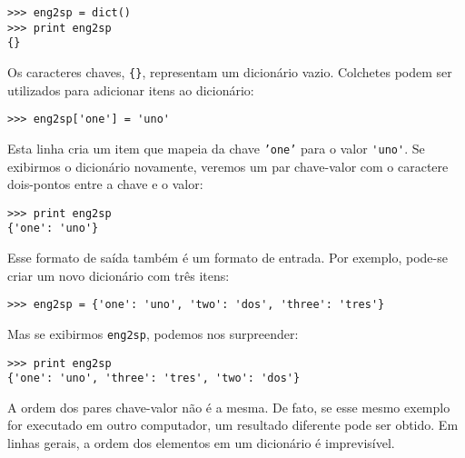 \beforeverb
\begin{verbatim}
>>> eng2sp = dict()
>>> print eng2sp
{}
\end{verbatim}
\afterverb
%

Os caracteres chaves, \verb"{}", representam um dicionário vazio.
Colchetes podem ser utilizados para adicionar itens ao dicionário:


\beforeverb
\begin{verbatim}
>>> eng2sp['one'] = 'uno'
\end{verbatim}
\afterverb
%

Esta linha cria um item que mapeia da chave {\tt 'one'}
para o valor \verb"'uno'". Se exibirmos o dicionário novamente, veremos
um par chave-valor com o caractere dois-pontos entre a chave e o valor:

\beforeverb
\begin{verbatim}
>>> print eng2sp
{'one': 'uno'}
\end{verbatim}
\afterverb
%

Esse formato de saída também é um formato de entrada. Por exemplo,
pode-se criar um novo dicionário com três itens:

\beforeverb
\begin{verbatim}
>>> eng2sp = {'one': 'uno', 'two': 'dos', 'three': 'tres'}
\end{verbatim}
\afterverb
%

Mas se exibirmos {\tt eng2sp}, podemos nos surpreender:

\beforeverb
\begin{verbatim}
>>> print eng2sp
{'one': 'uno', 'three': 'tres', 'two': 'dos'}
\end{verbatim}
\afterverb
%

A ordem dos pares chave-valor não é a mesma. De fato, se esse mesmo
exemplo for executado em outro computador, um resultado diferente pode
ser obtido. Em linhas gerais, a ordem dos elementos em um dicionário
é imprevisível.

